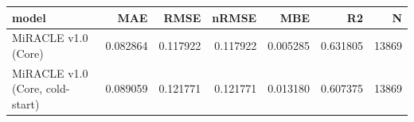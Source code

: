 \begin{tabular}{lrrrrrr}
\toprule
model & MAE & RMSE & nRMSE & MBE & R2 & N \\
\midrule
MiRACLE v1.0 (Core) & 0.082864 & 0.117922 & 0.117922 & 0.005285 & 0.631805 & 13869 \\
MiRACLE v1.0 (Core, cold-start) & 0.089059 & 0.121771 & 0.121771 & 0.013180 & 0.607375 & 13869 \\
\bottomrule
\end{tabular}
